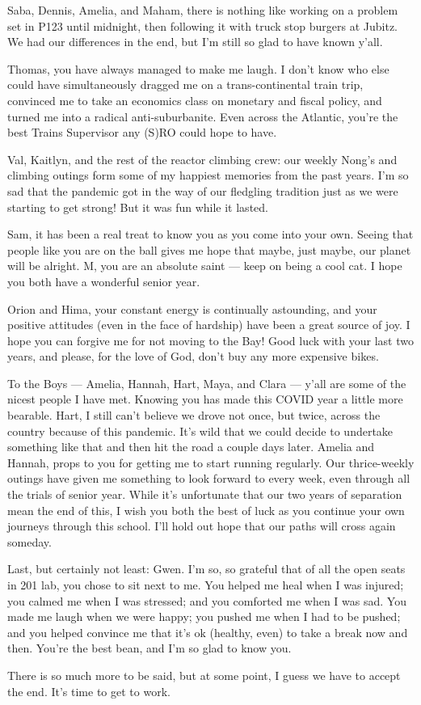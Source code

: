 \documentclass[../thesis.tex]{subfiles}
\begin{document}
	Saba, Dennis, Amelia, and Maham, there is nothing like working on a problem set in P123 until midnight, then following it with truck stop burgers at Jubitz. We had our differences in the end, but I'm still so glad to have known y'all.

	Thomas, you have always managed to make me laugh. I don't know who else could have simultaneously dragged me on a trans-continental train trip, convinced me to take an economics class on monetary and fiscal policy, and turned me into a radical anti-suburbanite. Even across the Atlantic, you're the best Trains Supervisor any (S)RO could hope to have.

	Val, Kaitlyn, and the rest of the reactor climbing crew: our weekly Nong's and climbing outings form some of my happiest memories from the past years. I'm so sad that the pandemic got in the way of our fledgling tradition just as we were starting to get strong! But it was fun while it lasted.

	Sam, it has been a real treat to know you as you come into your own. Seeing that people like you are on the ball gives me hope that maybe, just maybe, our planet will be alright. M, you are an absolute saint --- keep on being a cool cat. I hope you both have a wonderful senior year.

	Orion and Hima, your constant energy is continually astounding, and your positive attitudes (even in the face of hardship) have been a great source of joy. I hope you can forgive me for not moving to the Bay! Good luck with your last two years, and please, for the love of God, don't buy any more expensive bikes.

	To the Boys --- Amelia, Hannah, Hart, Maya, and Clara --- y'all are some of the nicest people I have met. Knowing you has made this COVID year a little more bearable. Hart, I still can't believe we drove not once, but twice, across the country because of this pandemic. It's wild that we could decide to undertake something like that and then hit the road a couple days later. Amelia and Hannah, props to you for getting me to start running regularly. Our thrice-weekly outings have given me something to look forward to every week, even through all the trials of senior year. While it's unfortunate that our two years of separation mean the end of this, I wish you both the best of luck as you continue your own journeys through this school. I'll hold out hope that our paths will cross again someday.

	Last, but certainly not least: Gwen. I'm so, so grateful that of all the open seats in 201 lab, you chose to sit next to me. You helped me heal when I was injured; you calmed me when I was stressed; and you comforted me when I was sad. You made me laugh when we were happy; you pushed me when I had to be pushed; and you helped convince me that it's ok (healthy, even) to take a break now and then. You're the best bean, and I'm so glad to know you.

	There is so much more to be said, but at some point, I guess we have to accept the end. It's time to get to work.
\end{document}
